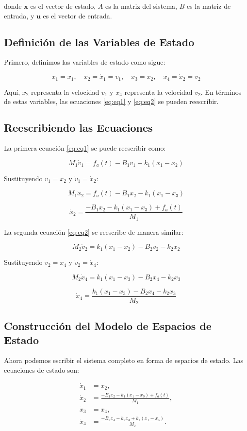 \documentclass{report}
\begin{document}
donde \(\mathbf{x}\) es el vector de estado, \(A\) es la matriz del sistema, \(B\) es la matriz de entrada, y \(\mathbf{u}\) es el vector de entrada.

\subsection{Definición de las Variables de Estado}

Primero, definimos las variables de estado como sigue:

\[
x_1 = x_1, \quad x_2 = \dot{x}_1 = v_1, \quad x_3 = x_2, \quad x_4 = \dot{x}_2 = v_2
\]

Aquí, \(x_2\) representa la velocidad \(v_1\) y \(x_4\) representa la velocidad \(v_2\). En términos de estas variables, las ecuaciones \ref{eq:eq1} y \ref{eq:eq2} se pueden reescribir.

\subsection{Reescribiendo las Ecuaciones}

La primera ecuación \ref{eq:eq1} se puede reescribir como:

\[
M_1 \dot{v}_1 = f_a(t) - B_1 v_1 - k_1 (x_1 - x_2)
\]

Sustituyendo \(v_1 = x_2\) y \(\dot{v}_1 = \dot{x}_2\):

\[
M_1 \dot{x}_2 = f_a(t) - B_1 x_2 - k_1 (x_1 - x_3)
\]

\[
\dot{x}_2 = \frac{-B_1 x_2 - k_1 (x_1 - x_3) + f_a(t)}{M_1}
\]

La segunda ecuación \ref{eq:eq2} se reescribe de manera similar:

\[
M_2 \dot{v}_2 = k_1 (x_1 - x_2) - B_2 v_2 - k_2 x_2
\]

Sustituyendo \(v_2 = x_4\) y \(\dot{v}_2 = \dot{x}_4\):

\[
M_2 \dot{x}_4 = k_1 (x_1 - x_3) - B_2 x_4 - k_2 x_3
\]

\[
\dot{x}_4 = \frac{k_1 (x_1 - x_3) - B_2 x_4 - k_2 x_3}{M_2}
\]

\subsection{Construcción del Modelo de Espacios de Estado}

Ahora podemos escribir el sistema completo en forma de espacios de estado. Las ecuaciones de estado son:

\[
\begin{aligned}
\dot{x}_1 &= x_2, \\
\dot{x}_2 &= \frac{-B_1 x_2 - k_1 (x_1 - x_3) + f_a(t)}{M_1}, \\
\dot{x}_3 &= x_4, \\
\dot{x}_4 &= \frac{-B_2 x_4 - k_2 x_3 + k_1 (x_1 - x_3)}{M_2}.
\end{aligned}
\]
\end{document}
